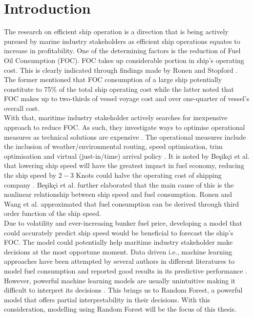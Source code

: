 \section{Introduction} \label{introduction}

The research on efficient ship operation is a direction that is being actively pursued by marine industry stakeholders as efficient ship operations equates to increase in profitability. One of the determining factors is the reduction of Fuel Oil Consumption (FOC). FOC takes up considerable portion in ship's operating cost. This is clearly indicated through findings made by Ronen \cite{Ronen.2011} and Stopford \cite{Stopford.2009}. The former mentioned that FOC consumption of a large ship potentially constitute to 75\% of the total ship operating cost while the latter noted that FOC makes up to two-thirds of vessel voyage cost and over one-quarter of vessel's overall cost. \\

With that, maritime industry stakeholder actively searches for inexpensive approach to reduce FOC. As such, they investigate ways to optimise operational measures as technical solutions are expensive \cite{Li.2022}. The operational measures include the inclusion of weather/environmental routing, speed optimisation, trim optimisation and virtual (just-in/time) arrival policy \cite{Li.2022}. It is noted by {Be{\c{s}}ik{\c{c}}i} et al. \cite{BalBesikci.2016} that lowering ship speed will have the greatest impact in fuel economy, reducing the ship speed by $2-3$ Knots could halve the operating cost of shipping company \cite{Stopford.2009,Wijnolst.2009}. {Be{\c{s}}ik{\c{c}}i} et al. further elaborated that the main cause of this is the nonlinear relationship between ship speed and fuel consumption. Ronen \cite{Ronen.1982,Ronen.2011} and Wang et al. \cite{Wang.2012} approximated that fuel consumption can be derived through third order function of the ship speed. \\

Due to volatility and ever-increasing bunker fuel price, developing a model that could accurately predict ship speed would be beneficial to forecast the ship's FOC. The model could potentially help maritime industry stakeholder make decisions at the most opportune moment. Data driven i.e., machine learning approaches have been attempted by several authors in different literatures to model fuel consumption and reported good results in its predictive performance \cite{BalBesikci.2016,Jeon.2018,Gkerekos.2019,Abebe.2020,Kim.2021}. However, powerful machine learning models are usually unintuitive making it difficult to interpret its decisions \cite{Geron.2019}. This brings us to Random Forest, a powerful model that offers partial interpretability in their decisions. With this consideration, modelling using Random Forest will be the focus of this thesis. \\


